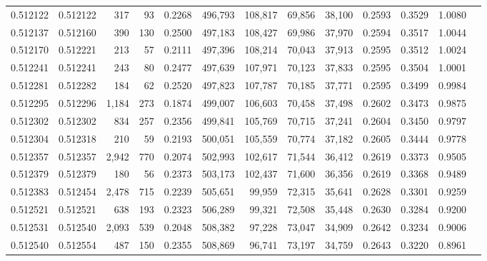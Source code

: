 \begin{tabular}{rrrrrrrrrrrrr}
0.512122 & 0.512122 &   317 &    93 &                                     0.2268 & 496,793 & 108,817 &  69,856 &  38,100 & 0.2593 & 0.3529 & 1.0080 \\
0.512137 & 0.512160 &   390 &   130 &                                     0.2500 & 497,183 & 108,427 &  69,986 &  37,970 & 0.2594 & 0.3517 & 1.0044 \\
0.512170 & 0.512221 &   213 &    57 &                                     0.2111 & 497,396 & 108,214 &  70,043 &  37,913 & 0.2595 & 0.3512 & 1.0024 \\
0.512241 & 0.512241 &   243 &    80 &                                     0.2477 & 497,639 & 107,971 &  70,123 &  37,833 & 0.2595 & 0.3504 & 1.0001 \\
0.512281 & 0.512282 &   184 &    62 &                                     0.2520 & 497,823 & 107,787 &  70,185 &  37,771 & 0.2595 & 0.3499 & 0.9984 \\
0.512295 & 0.512296 & 1,184 &   273 &                                     0.1874 & 499,007 & 106,603 &  70,458 &  37,498 & 0.2602 & 0.3473 & 0.9875 \\
0.512302 & 0.512302 &   834 &   257 &                                     0.2356 & 499,841 & 105,769 &  70,715 &  37,241 & 0.2604 & 0.3450 & 0.9797 \\
0.512304 & 0.512318 &   210 &    59 &                                     0.2193 & 500,051 & 105,559 &  70,774 &  37,182 & 0.2605 & 0.3444 & 0.9778 \\
0.512357 & 0.512357 & 2,942 &   770 &                                     0.2074 & 502,993 & 102,617 &  71,544 &  36,412 & 0.2619 & 0.3373 & 0.9505 \\
0.512379 & 0.512379 &   180 &    56 &                                     0.2373 & 503,173 & 102,437 &  71,600 &  36,356 & 0.2619 & 0.3368 & 0.9489 \\
0.512383 & 0.512454 & 2,478 &   715 &                                     0.2239 & 505,651 &  99,959 &  72,315 &  35,641 & 0.2628 & 0.3301 & 0.9259 \\
0.512521 & 0.512521 &   638 &   193 &                                     0.2323 & 506,289 &  99,321 &  72,508 &  35,448 & 0.2630 & 0.3284 & 0.9200 \\
0.512531 & 0.512540 & 2,093 &   539 &                                     0.2048 & 508,382 &  97,228 &  73,047 &  34,909 & 0.2642 & 0.3234 & 0.9006 \\
0.512540 & 0.512554 &   487 &   150 &                                     0.2355 & 508,869 &  96,741 &  73,197 &  34,759 & 0.2643 & 0.3220 & 0.8961 \\

\end{tabular}
